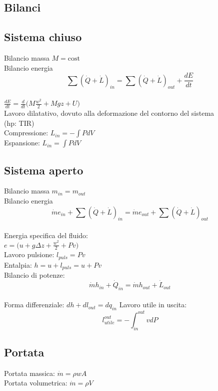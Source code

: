 \documentclass[portrait,a4paper]{article}
\begin{document}
\begin{multicols}{3}


\section*{Bilanci}
\subsection*{Sistema chiuso}
Bilancio massa \(M = \text{cost}\) \\
Bilancio energia \\
\[\sum (\dot{Q}+\dot L)_{in} = \sum (\dot{Q}+ \dot{L})_{out} + \frac{dE}{dt} \] \\
$\frac{dE}{dt} = \frac{d}{dt}\big(M \frac{w^2}{2} + Mgz + U\big)$ \\
Lavoro dilatativo, dovuto alla deformazione del contorno del sistema \\(hp: TIR) \\
Compressione: \( L_{in} = - \int P dV\) \\
Espansione: \(L_{in} = \int P dV\)

\subsection*{Sistema aperto}
Bilancio massa \(m_{in} = m_{out}\) \\
Bilancio energia \\
\[ \dot{m}e_{in} + \sum (\dot{Q}+\dot L)_{in} = \dot{m}e_{out} + \sum (\dot{Q}+ \dot{L})_{out} \] \\
Energia specifica del fluido: \\
\(e = \big(u + g\Delta z + \frac{w^2}{2} + Pv \big)\) \\
Lavoro pulsione: \(l_{puls} = Pv\) \\
Entalpia: \(h = u + l_{puls} = u + Pv\) \\
Bilancio di potenze: \\
\[ \dot{m}h_{in} + \dot{Q}_{in} = \dot{m}h_{out} + \dot{L}_{out} \] \\
Forma differenziale: \(dh + dl_{out} = dq_{in}\)
Lavoro utile in uscita: \\
\[l_{utile}^{out} = - \int_{in}^{out} vdP\]

\subsection*{Portata}
Portata massica: \( \dot m = \rho w A \) \\
Portata volumetrica: \( \dot m = \rho V \)


\end{multicols}
\end{document}
